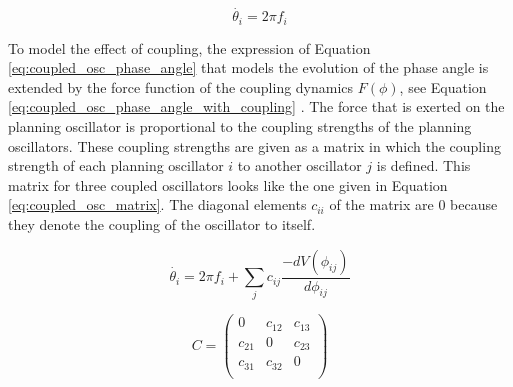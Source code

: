 \begin{equation}
\dot{\theta_i} =  2 \pi f_i
\label{eq:coupled_osc_phase_angle}
\end{equation}

To model the effect of coupling, the expression of Equation \ref{eq:coupled_osc_phase_angle} that models the evolution of the phase angle is extended by the force function of the coupling dynamics $F(\phi)$, see Equation \ref{eq:coupled_osc_phase_angle_with_coupling} \citep{Tilsen2017}. The force that is exerted on the planning oscillator is proportional to the coupling strengths of the planning oscillators. These coupling strengths are given as a matrix in which the coupling strength of each planning oscillator $i$ to another oscillator $j$ is defined. This matrix for three coupled oscillators looks like the one given in Equation \ref{eq:coupled_osc_matrix}. The diagonal elements $c_{ii}$ of the matrix are $0$ because they denote the coupling of the oscillator to itself.

\begin{equation}
\dot{\theta_i} =  2 \pi f_i + \sum_j{ c_{ij} \frac{-dV(\phi_{ij})}{d\phi_{ij}}}
\label{eq:coupled_osc_phase_angle_with_coupling}
\end{equation}

\begin{equation}
C = 
\begin{pmatrix}
0 & c_{12} & c_{13} \\
c_{21} & 0 & c_{23} \\
c_{31} & c_{32} & 0 \\
\end{pmatrix}
\label{eq:coupled_osc_matrix}
\end{equation}

